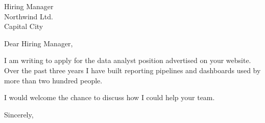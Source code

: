 \documentclass[11pt]{letter}
\begin{document}
\begin{letter}{Hiring Manager \\ Northwind Ltd. \\ Capital City}
\opening{Dear Hiring Manager,}

I am writing to apply for the data analyst position advertised on your website.
Over the past three years I have built reporting pipelines and dashboards used
by more than two hundred people.

I would welcome the chance to discuss how I could help your team.

\closing{Sincerely,}
\end{letter}
\end{document}
